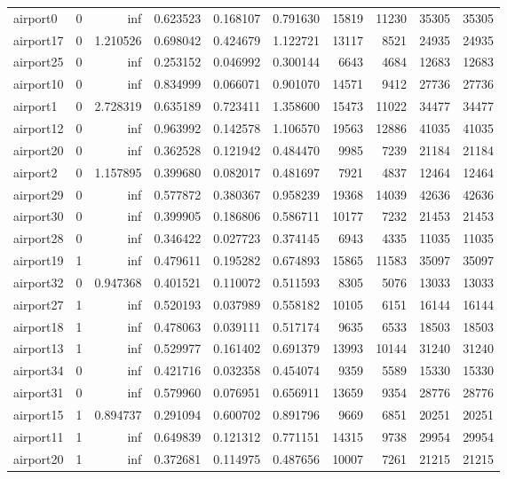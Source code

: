 \begin{longtable}{|l|r|r|r|r|r|r|r|r|r|}
airport0 & 0 & inf & 0.623523 & 0.168107 & 0.791630 & 15819 & 11230 & 35305 & 35305 \\
airport17 & 0 & 1.210526 & 0.698042 & 0.424679 & 1.122721 & 13117 & 8521 & 24935 & 24935 \\
airport25 & 0 & inf & 0.253152 & 0.046992 & 0.300144 & 6643 & 4684 & 12683 & 12683 \\
airport10 & 0 & inf & 0.834999 & 0.066071 & 0.901070 & 14571 & 9412 & 27736 & 27736 \\
airport1 & 0 & 2.728319 & 0.635189 & 0.723411 & 1.358600 & 15473 & 11022 & 34477 & 34477 \\
airport12 & 0 & inf & 0.963992 & 0.142578 & 1.106570 & 19563 & 12886 & 41035 & 41035 \\
airport20 & 0 & inf & 0.362528 & 0.121942 & 0.484470 & 9985 & 7239 & 21184 & 21184 \\
airport2 & 0 & 1.157895 & 0.399680 & 0.082017 & 0.481697 & 7921 & 4837 & 12464 & 12464 \\
airport29 & 0 & inf & 0.577872 & 0.380367 & 0.958239 & 19368 & 14039 & 42636 & 42636 \\
airport30 & 0 & inf & 0.399905 & 0.186806 & 0.586711 & 10177 & 7232 & 21453 & 21453 \\
airport28 & 0 & inf & 0.346422 & 0.027723 & 0.374145 & 6943 & 4335 & 11035 & 11035 \\
airport19 & 1 & inf & 0.479611 & 0.195282 & 0.674893 & 15865 & 11583 & 35097 & 35097 \\
airport32 & 0 & 0.947368 & 0.401521 & 0.110072 & 0.511593 & 8305 & 5076 & 13033 & 13033 \\
airport27 & 1 & inf & 0.520193 & 0.037989 & 0.558182 & 10105 & 6151 & 16144 & 16144 \\
airport18 & 1 & inf & 0.478063 & 0.039111 & 0.517174 & 9635 & 6533 & 18503 & 18503 \\
airport13 & 1 & inf & 0.529977 & 0.161402 & 0.691379 & 13993 & 10144 & 31240 & 31240 \\
airport34 & 0 & inf & 0.421716 & 0.032358 & 0.454074 & 9359 & 5589 & 15330 & 15330 \\
airport31 & 0 & inf & 0.579960 & 0.076951 & 0.656911 & 13659 & 9354 & 28776 & 28776 \\
airport15 & 1 & 0.894737 & 0.291094 & 0.600702 & 0.891796 & 9669 & 6851 & 20251 & 20251 \\
airport11 & 1 & inf & 0.649839 & 0.121312 & 0.771151 & 14315 & 9738 & 29954 & 29954 \\
airport20 & 1 & inf & 0.372681 & 0.114975 & 0.487656 & 10007 & 7261 & 21215 & 21215 \\

\end{longtable}
